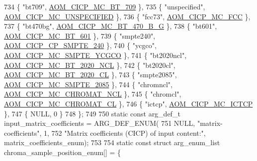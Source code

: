 \begin{DoxyCodeInclude}
{{{{{{{734   \{ \textcolor{stringliteral}{"bt709"}, \hyperlink{aom__image_8h_a6bc018ed9689367acae810bc58527081aa70fd9b88bc91bd0d126aaa07421c49a}{AOM\_CICP\_MC\_BT\_709} \},
735   \{ \textcolor{stringliteral}{"unspecified"}, \hyperlink{aom__image_8h_a6bc018ed9689367acae810bc58527081a06a4defb1e5d9bb1d2aad092b8656a03}{AOM\_CICP\_MC\_UNSPECIFIED} \},
736   \{ \textcolor{stringliteral}{"fcc73"}, \hyperlink{aom__image_8h_a6bc018ed9689367acae810bc58527081ae368663c2c2f34683b513e159c5738b9}{AOM\_CICP\_MC\_FCC} \},
737   \{ \textcolor{stringliteral}{"bt470bg"}, \hyperlink{aom__image_8h_a6bc018ed9689367acae810bc58527081ae9107262b437659514abdcd928e977db}{AOM\_CICP\_MC\_BT\_470\_B\_G} \},
738   \{ \textcolor{stringliteral}{"bt601"}, \hyperlink{aom__image_8h_a6bc018ed9689367acae810bc58527081a0f81310501079cc1184d5265ae2c18a5}{AOM\_CICP\_MC\_BT\_601} \},
739   \{ \textcolor{stringliteral}{"smpte240"}, \hyperlink{aom__image_8h_a5267ad095a088ece3499336812503cefa1a8b2e5694489121f80a406d9da25dfb}{AOM\_CICP\_CP\_SMPTE\_240} \},
740   \{ \textcolor{stringliteral}{"ycgco"}, \hyperlink{aom__image_8h_a6bc018ed9689367acae810bc58527081aa2140164b26b42404c376cc921ce27c5}{AOM\_CICP\_MC\_SMPTE\_YCGCO} \},
741   \{ \textcolor{stringliteral}{"bt2020ncl"}, \hyperlink{aom__image_8h_a6bc018ed9689367acae810bc58527081adf60aa79c6a68f4eb41e1095f8bf7bf6}{AOM\_CICP\_MC\_BT\_2020\_NCL} \},
742   \{ \textcolor{stringliteral}{"bt2020cl"}, \hyperlink{aom__image_8h_a6bc018ed9689367acae810bc58527081a34148eae7b467eece6af5c90405dde6b}{AOM\_CICP\_MC\_BT\_2020\_CL} \},
743   \{ \textcolor{stringliteral}{"smpte2085"}, \hyperlink{aom__image_8h_a6bc018ed9689367acae810bc58527081a3aeb0ed0afc0a92ce758f109cd05ee80}{AOM\_CICP\_MC\_SMPTE\_2085} \},
744   \{ \textcolor{stringliteral}{"chromncl"}, \hyperlink{aom__image_8h_a6bc018ed9689367acae810bc58527081a30661e9d9b70ffe9f51f3bdbfd02865b}{AOM\_CICP\_MC\_CHROMAT\_NCL} \},
745   \{ \textcolor{stringliteral}{"chromcl"}, \hyperlink{aom__image_8h_a6bc018ed9689367acae810bc58527081aa391f9255e4775da0120f7472b417193}{AOM\_CICP\_MC\_CHROMAT\_CL} \},
746   \{ \textcolor{stringliteral}{"ictcp"}, \hyperlink{aom__image_8h_a6bc018ed9689367acae810bc58527081a7695b0577d3884a89c578f28f4237aee}{AOM\_CICP\_MC\_ICTCP} \},
747   \{ NULL, 0 \}
748 \};
749 
750 \textcolor{keyword}{static} \textcolor{keyword}{const} arg\_def\_t input\_matrix\_coefficients = ARG\_DEF\_ENUM(
751     NULL, \textcolor{stringliteral}{"matrix-coefficients"}, 1,
752     \textcolor{stringliteral}{"Matrix coefficients (CICP) of input content:"}, matrix\_coefficients\_enum);
753 
754 \textcolor{keyword}{static} \textcolor{keyword}{const} \textcolor{keyword}{struct }arg\_enum\_list chroma\_sample\_position\_enum[] = \{
}}}}}}}
\end{DoxyCodeInclude}

